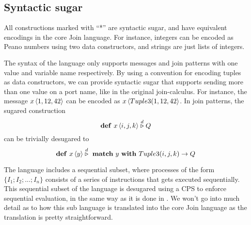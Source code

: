 \subsection{Syntactic sugar}
All constructions marked with ``*'' are syntactic sugar, and have equivalent
encodings in the core Join language. For instance, integers can be encoded as
Peano numbers using two data constructors, and strings are just lists of
integers.

The syntax of the language only supports messages and join patterns with one
value and variable name respectively. By using a convention for encoding tuples
as data constructors, we can provide syntactic sugar that supports sending more
than one value on a port name, like in the original join-calculus. For instance,
the message $\atm x<1, 12, 42>$ can be encoded as $\atm x<Tuple3(1, 12, 42>$. In
join patterns, the sugared construction
\begin{equation*}
 \mathbf{def}~\atm x<i,j,k> \stackrel{d}{\triangleright} Q
\end{equation*}
can be trivially desugared to
\begin{equation*}
 \mathbf{def}~\atm x<y> \stackrel{d}{\triangleright} ~\mathbf{match}~ y
 ~\mathbf{with}~ Tuple3(i,j,k) \rightarrow Q
\end{equation*}

The language includes a sequential subset, where processes of the form $\{ I_1;
I_2;...;I_n\}$ consists of a series of instructions that gets executed
sequentially. This sequential subset of the language is desugared using a CPS to
enforce sequential evaluation, in the same way as it is done in
\cite{fournet1996reflexive}. We won't go into much detail as to how this sub
language is translated into the core Join language as the translation is pretty
straightforward.


